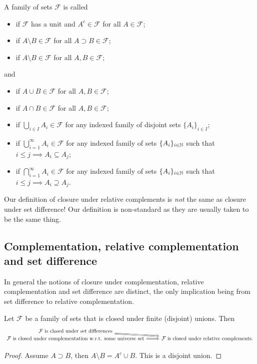 \begin{definition}
A family of sets $\mathcal{F}$ is called
\begin{itemize}
\item {} if $\mathcal{F}$ has a unit and $A^c\in\mathcal{F}$ for all $A\in\mathcal{F}$;
\item {} if $A\setminus B\in\mathcal{F}$ for all $A \supset B\in\mathcal{F}$;
\item {} if $A\setminus B\in\mathcal{F}$ for all $A, B\in\mathcal{F}$;
\end{itemize}
and
\begin{itemize}
\item {} if $A\cup B \in\mathcal{F}$ for all $A,B\in\mathcal{F}$;
\item {} if $A\cap B \in\mathcal{F}$ for all $A,B\in\mathcal{F}$;
\item {} if $\bigcup_{i\in I}A_i \in\mathcal{F}$ for any indexed family of disjoint sets $\{A_i\}_{i\in I}$;
\item {} if $\bigcup_{i=1}^\infty A_i \in\mathcal{F}$ for any indexed family of sets $\{A_i\}_{i\in \mathbb{N}}$ such that $i\leq j \implies A_i \subseteq A_j$;
\item {} if $\bigcap_{i=1}^\infty A_i \in\mathcal{F}$ for any indexed family of sets $\{A_i\}_{i\in \mathbb{N}}$ such that $i\leq j \implies A_i \supseteq A_j$.
\end{itemize}
Our definition of closure under relative complements is \emph{not} the same as closure under set difference! Our definition is non-standard as they are usually taken to be the same thing.
\end{definition}

\subsection{Complementation, relative complementation and set difference}
In general the notions of closure under complementation, relative complementation and set difference are distinct, the only implication being from set difference to relative complementation.

\begin{lemma} \label{lemma:complementTypesUnionClosure}
Let $\mathcal{F}$ be a family of sets that is closed under finite (disjoint) unions. Then
\[ \begin{tikzcd}[row sep=0]
\text{$\mathcal{F}$ is closed under set differences} \arrow[dr, Rightarrow] & \\
\text{$\mathcal{F}$ is closed under complementation w.r.t. some universe set} \arrow[r,Rightarrow] & \text{$\mathcal{F}$ is closed under relative complements.}
\end{tikzcd} \]
\end{lemma}
\begin{proof}
Assume $A\supset B$, then $A\setminus B = A^c \cup B$. This is a disjoint union.
\end{proof}

